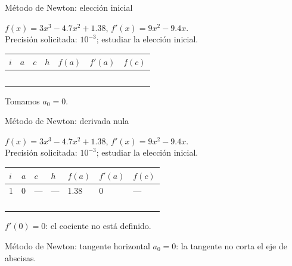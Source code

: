 \documentclass[main.tex]{subfiles}
\begin{document}
\begin{frame}[t]{Método de Newton: elección inicial}
\begin{minipage}[t][17mm]{\textwidth}\small
$f(x)=3x^3-4.7x^2+1.38$, $f'(x)=9x^2-9.4x$.\\
Precisión solicitada: $10^{-3}$; estudiar la elección inicial.
\end{minipage}\begingroup\scriptsize\setlength{\tabcolsep}{2pt}
\begin{center}\begin{tabular}{|C{.04\textwidth}|*{6}{C{.135\textwidth}|}}\hline
$i$&$a$&$c$&$h$&$f(a)$&$f'(a)$&$f(c)$\\\hline
\rule{0pt}{5mm}&&&&&&\\\hline
\rule{0pt}{5mm}&&&&&&\\\hline
\rule{0pt}{5mm}&&&&&&\\\hline
\rule{0pt}{5mm}&&&&&&\\\hline
\rule{0pt}{5mm}&&&&&&\\\hline
\end{tabular}\end{center}\endgroup\small Tomamos $a_0=0$.
\end{frame}
\begin{frame}[t]{Método de Newton: derivada nula}
\begin{minipage}[t][17mm]{\textwidth}\small
$f(x)=3x^3-4.7x^2+1.38$, $f'(x)=9x^2-9.4x$.\\
Precisión solicitada: $10^{-3}$; estudiar la elección inicial.
\end{minipage}\begingroup\scriptsize\setlength{\tabcolsep}{2pt}
\begin{center}\begin{tabular}{|C{.04\textwidth}|*{6}{C{.135\textwidth}|}}\hline
$i$&$a$&$c$&$h$&$f(a)$&$f'(a)$&$f(c)$\\\hline
\rule{0pt}{5mm}1&0&---&---&1.38&0&---\\\hline
\rule{0pt}{5mm}&&&&&&\\\hline
\rule{0pt}{5mm}&&&&&&\\\hline
\rule{0pt}{5mm}&&&&&&\\\hline
\rule{0pt}{5mm}&&&&&&\\\hline
\end{tabular}\end{center}\endgroup\small $f\prime(0)=0$: el cociente no está definido.
\end{frame}
\begin{frame}[t]{Método de Newton: tangente horizontal}
$a_0=0$: la tangente no corta el eje de abscisas.
\end{frame}
\end{document}
